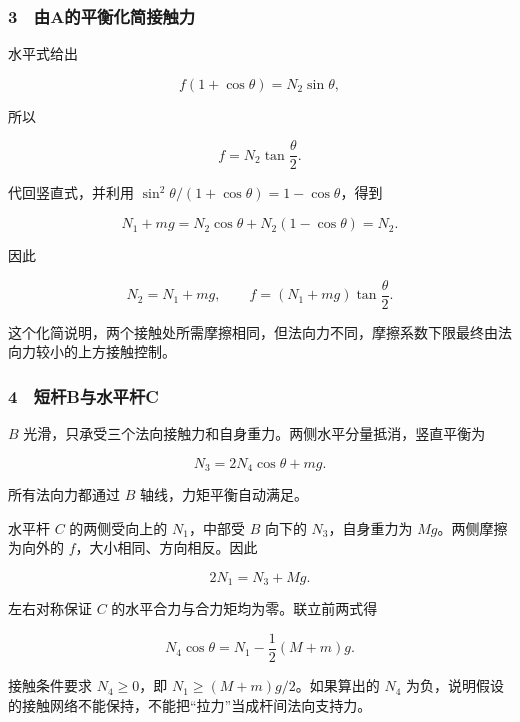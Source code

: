 \documentclass[12pt,a4paper,fontset=fandol]{ctexart}
\begin{document}
\subsubsection{3　由A的平衡化简接触力}\label{ux7531aux7684ux5e73ux8861ux5316ux7b80ux63a5ux89e6ux529b}

水平式给出

\[f(1+\cos\theta)=N_2\sin\theta,\]

所以

\[\boxed{f=N_2\tan\frac\theta2.}\]

代回竖直式，并利用 \(\sin^2\theta/(1+\cos\theta)=1-\cos\theta\)，得到

\[N_1+mg=N_2\cos\theta+N_2(1-\cos\theta)=N_2.\]

因此

\[\boxed{N_2=N_1+mg,\qquad
f=(N_1+mg)\tan\frac\theta2.}\]

这个化简说明，两个接触处所需摩擦相同，但法向力不同，摩擦系数下限最终由法向力较小的上方接触控制。

\subsubsection{4　短杆B与水平杆C}\label{ux77edux6746bux4e0eux6c34ux5e73ux6746c}

\(B\) 光滑，只承受三个法向接触力和自身重力。两侧水平分量抵消，竖直平衡为

\[\boxed{N_3=2N_4\cos\theta+mg.}\]

所有法向力都通过 \(B\) 轴线，力矩平衡自动满足。

水平杆 \(C\) 的两侧受向上的 \(N_1\)，中部受 \(B\) 向下的
\(N_3\)，自身重力为 \(Mg\)。两侧摩擦为向外的
\(f\)，大小相同、方向相反。因此

\[\boxed{2N_1=N_3+Mg.}\]

左右对称保证 \(C\) 的水平合力与合力矩均为零。联立前两式得

\[\boxed{N_4\cos\theta=N_1-\frac12(M+m)g.}\]

接触条件要求 \(N_4\ge0\)，即 \(N_1\ge(M+m)g/2\)。如果算出的 \(N_4\)
为负，说明假设的接触网络不能保持，不能把``拉力''当成杆间法向支持力。
\end{document}
